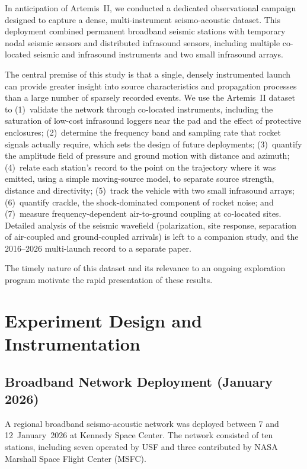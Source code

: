 \documentclass[]{seismica}
\begin{document}
In anticipation of Artemis~II, we conducted a dedicated observational
campaign designed to capture a dense, multi-instrument seismo-acoustic
dataset. This deployment combined permanent broadband seismic stations
with temporary nodal seismic sensors and distributed infrasound
sensors, including multiple co-located seismic and infrasound
instruments and two small infrasound arrays.

The central premise of this study is that a single, densely instrumented
launch can provide greater insight into source characteristics and
propagation processes than a large number of sparsely recorded events.
We use the Artemis~II dataset to
(1)~validate the network through co-located instruments, including the
saturation of low-cost infrasound loggers near the pad and the effect of
protective enclosures;
(2)~determine the frequency band and sampling rate that rocket signals
actually require, which sets the design of future deployments;
(3)~quantify the amplitude field of pressure and ground motion with
distance and azimuth;
(4)~relate each station's record to the point on the trajectory where it
was emitted, using a simple moving-source model, to separate source
strength, distance and directivity;
(5)~track the vehicle with two small infrasound arrays;
(6)~quantify crackle, the shock-dominated component of rocket noise; and
(7)~measure frequency-dependent air-to-ground coupling at co-located
sites.
Detailed analysis of the seismic wavefield (polarization, site
response, separation of air-coupled and ground-coupled arrivals) is left
to a companion study, and the 2016--2026 multi-launch record to a
separate paper.

The timely nature of this dataset and its relevance to an ongoing
exploration program motivate the rapid presentation of these results.


\section{Experiment Design and Instrumentation}

\subsection{Broadband Network Deployment (January 2026)}

A regional broadband seismo-acoustic network was deployed between 7 and
12~January~2026 at Kennedy Space Center. The network consisted of ten
stations, including seven operated by USF and three contributed by NASA
Marshall Space Flight Center (MSFC).
\end{document}
